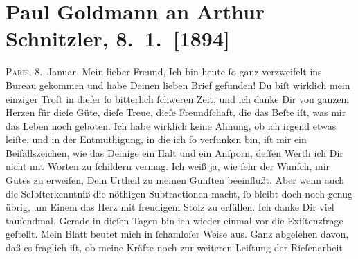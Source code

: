 

               \section[Paul Goldmann an Arthur Schnitzler, 8. 1. {[}1894{]}]{ Paul Goldmann an Arthur Schnitzler, 8. 1. {[}1894{]}}\nopagebreak{}\rehead{ }\begin{ledgroupsized}[t]{13cm}\normalsize\beginnumbering{} \toendnotes[C]{\smallbreak\pagebreak[2]} 
\toendnotes[C]{\smallbreak}\pstart
           \raggedleft{}{\pb}\textsc{Paris,}{ }8. Januar.\pend
           \pstart\center{}Mein lieber Freund,\pend\pstart
           Ich bin heute ſo ganz verzweifelt ins Bureau gekommen und habe Deinen lieben Brief gefunden! Du
               biſt wirklich mein einziger Troſt in dieſer ſo bitterlich ſchweren Zeit, und ich
               danke Dir von ganzem Herzen für dieſe Güte, dieſe Treue, dieſe Freundſchaft, die das
               Beſte iſt, was mir das Leben noch geboten. Ich habe wirklich keine Ahnung, ob ich
               irgend etwas leiſte, und in der Entmuthigung, in die ich ſo verſunken bin, iſt mir
                  ein\strikeout{\textcolor{gray}{e}} Beifallszeichen, wie das Deinige ein Halt und {\pb}ein Anſporn, deſſen Werth ich Dir nicht mit Worten zu ſchildern vermag. Ich weiß
               ja, wie ſehr der Wunſch, mir Gutes zu erweiſen, Dein Urtheil zu meinen Gunſten
               beeinflußt. Aber wenn auch die Selbſterkenntniß die nöthigen Subtractionen macht, ſo
               bleibt doch noch genug übrig, um Einem das Herz mit freudigem Stolz zu erfüllen. Ich
               danke Dir viel tauſendmal.\pend
           \pstart
           Gerade in dieſen Tagen bin ich wieder einmal vor die Exiſtenzfrage geſtellt. Mein Blatt beutet mich {\pb}in ſchamloſer Weise aus. Ganz abgeſehen davon, daß
               es fraglich iſt, ob meine Kräfte noch zur weiteren Leiſtung der Rieſenarbeit

\end{ledgroupsized}
